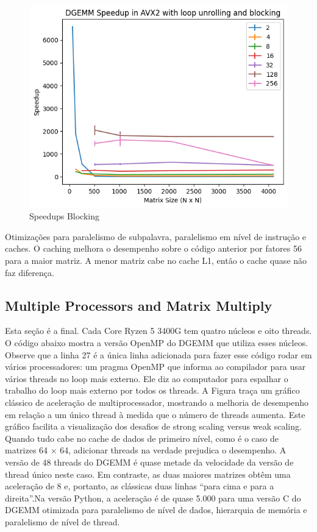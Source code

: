 \documentclass[12pt]{article}
\begin{document}
\begin{figure}[h]
    \centering
    \includegraphics[scale=0.6]{figures/speedups_blocking.png}
    \caption{Speedups Blocking}
    \label{fig:speedups-blocking}
\end{figure}

Otimizações para paralelismo de subpalavra, paralelismo em nível de instrução e caches. O caching melhora o desempenho sobre o código anterior por fatores 56 para a maior matriz. A menor matriz cabe no cache L1, então o cache quase não faz diferença.

\newpage
\newpage

\subsection{Multiple Processors and Matrix Multiply}

Esta seção é a final. Cada Core Ryzen 5 3400G tem quatro núcleos e oito threads. O código abaixo mostra a versão OpenMP do DGEMM que utiliza esses núcleos. Observe que a linha 27 é a única linha adicionada para fazer esse código rodar em vários processadores: um pragma OpenMP que informa ao compilador para usar vários threads no loop mais externo. Ele diz ao computador para espalhar o trabalho do loop mais externo por todos os threads. A Figura traça um gráfico clássico de aceleração de multiprocessador, mostrando a melhoria de desempenho em relação a um único thread à medida que o número de threads aumenta. Este gráfico facilita a visualização dos desafios de strong scaling versus weak scaling. Quando tudo cabe no cache de dados de primeiro nível, como é o caso de matrizes 64 × 64, adicionar threads na verdade prejudica o desempenho. A versão de 48 threads do DGEMM é quase metade da velocidade da versão de thread único neste caso. Em contraste, as duas maiores matrizes obtêm uma aceleração de 8 e, portanto, as clássicas duas linhas “para cima e para a direita”.Na versão Python, a aceleração é de quase 5.000 para uma versão C do DGEMM otimizada para paralelismo de nível de dados, hierarquia de memória e paralelismo de nível de thread.
\end{document}

